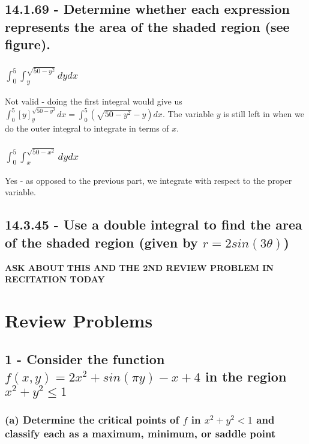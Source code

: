 \documentclass{article}
\begin{document}
\subsection{14.1.69 - Determine whether each expression represents the area of the shaded region (see figure).}
\subsubsection{$\int_{0}^{5}\int_{y}^{\sqrt{50 - y^{2}}}dydx$}
\par\noindent\large Not valid - doing the first integral would give us $\int_{0}^{5}[y]^{\sqrt{50 - y^{2}}}_{y}dx = \int_{0}^{5}(\sqrt{50 - y^{2}} - y) dx$.  The variable $y$ is still left in when we do the outer integral to integrate in terms of $x$.

\subsubsection{$\int_{0}^{5}\int_{x}^{\sqrt{50 - x^{2}}}dydx$}
\par\noindent\large Yes - as opposed to the previous part, we integrate with respect to the proper variable.

\subsubsection{}

\subsection{14.3.45 - Use a double integral to find the area of the shaded region (given by $r = 2sin(3\theta)$)}
\textbf{ASK ABOUT THIS AND THE 2ND REVIEW PROBLEM IN RECITATION TODAY}

\par\noindent\large \section{Review Problems}
\subsection{1 - Consider the function $f(x, y) = 2x^{2} + sin(\pi y) - x + 4$ in the region $x^{2} + y^{2} \leq 1$}
\subsubsection{(a) Determine the critical points of $f$ in $x^{2} + y^{2} < 1$ and classify each as a maximum, minimum, or saddle point}
\end{document}
